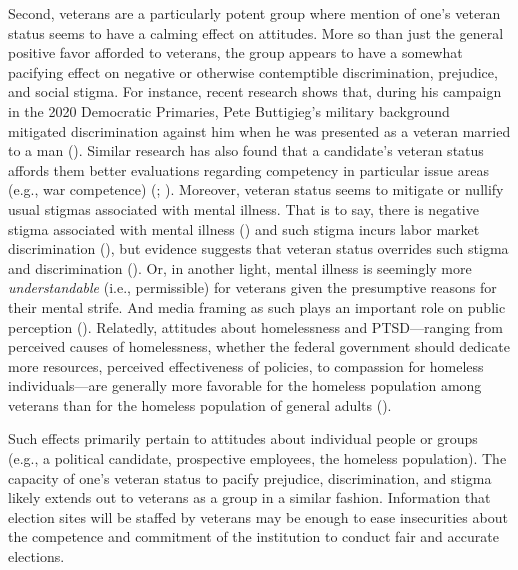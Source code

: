 \documentclass[
  12pt,
  letterpaper,
]{article}
\begin{document}
Second, veterans are a particularly potent group where mention of one's
veteran status seems to have a calming effect on attitudes. More so than
just the general positive favor afforded to veterans, the group appears
to have a somewhat pacifying effect on negative or otherwise
contemptible discrimination, prejudice, and social stigma. For instance,
recent research shows that, during his campaign in the 2020 Democratic
Primaries, Pete Buttigieg's military background mitigated discrimination
against him when he was presented as a veteran married to a man
(). Similar research
has also found that a candidate's veteran status affords them better
evaluations regarding competency in particular issue areas (e.g., war
competence) (;
). Moreover, veteran status seems
to mitigate or nullify usual stigmas associated with mental illness.
That is to say, there is negative stigma associated with mental illness
() and such stigma
incurs labor market discrimination (), but evidence suggests that veteran status overrides such
stigma and discrimination (). Or, in another light, mental illness is seemingly more
\emph{understandable} (i.e., permissible) for veterans given the
presumptive reasons for their mental strife. And media framing as such
plays an important role on public perception
(). Relatedly,
attitudes about homelessness and PTSD---ranging from perceived causes of
homelessness, whether the federal government should dedicate more
resources, perceived effectiveness of policies, to compassion for
homeless individuals---are generally more favorable for the homeless
population among veterans than for the homeless population of general
adults ().

Such effects primarily pertain to attitudes about individual people or
groups (e.g., a political candidate, prospective employees, the homeless
population). The capacity of one's veteran status to pacify prejudice,
discrimination, and stigma likely extends out to veterans as a group in
a similar fashion. Information that election sites will be staffed by
veterans may be enough to ease insecurities about the competence and
commitment of the institution to conduct fair and accurate elections.
\end{document}
